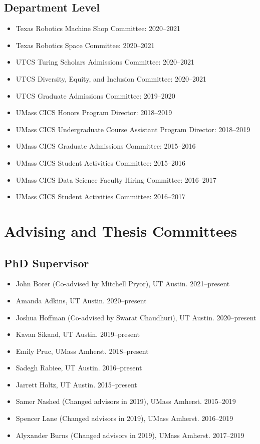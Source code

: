 \documentclass[Times]{article}
\begin{document}
\subsection*{Department Level}
\begin{itemize}
 \item Texas Robotics Machine Shop Committee: 2020--2021
 \item Texas Robotics Space Committee: 2020--2021
 \item UTCS Turing Scholars Admissions Committee: 2020--2021
 \item UTCS Diversity, Equity, and Inclusion Committee: 2020--2021
 \item UTCS Graduate Admissions Committee: 2019--2020
 \item UMass CICS Honors Program Director: 2018--2019
 \item UMass CICS Undergraduate Course Assistant Program Director: 2018--2019
 \item UMass CICS Graduate Admissions Committee: 2015--2016
 \item UMass CICS Student Activities Committee: 2015--2016
 \item UMass CICS Data Science Faculty Hiring Committee: 2016--2017
 \item UMass CICS Student Activities Committee: 2016--2017
\end{itemize}

\section*{Advising and Thesis Committees}

\subsection*{PhD Supervisor}
\begin{itemize}
 \item John Borer (Co-advised by Mitchell Pryor), UT Austin. 2021--present
 \item Amanda Adkins, UT Austin. 2020--present
 \item Joshua Hoffman (Co-advised by Swarat Chaudhuri), UT Austin. 2020--present
 \item Kavan Sikand, UT Austin. 2019--present
 \item Emily Pruc, UMass Amherst. 2018--present
 \item Sadegh Rabiee, UT Austin. 2016--present
 \item Jarrett Holtz, UT Austin. 2015--present
 \item Samer Nashed (Changed advisors in 2019), UMass Amherst. 2015--2019
 \item Spencer Lane (Changed advisors in 2019), UMass Amherst. 2016--2019
 \item Alyxander Burns (Changed advisors in 2019), UMass Amherst. 2017--2019
\end{itemize}
\end{document}
